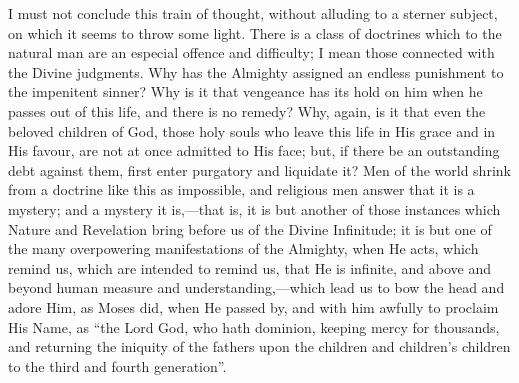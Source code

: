 I must not conclude this train of thought, without alluding to a
sterner subject, on which it seems to throw some light. There is a
class of doctrines which to the natural man are an especial offence
and difficulty; I mean those connected with the Divine judgments. Why
has the Almighty assigned an endless punishment to the impenitent
sinner? Why is it that vengeance has its hold on him when he passes
out of this life, and there is no remedy? Why, again, is it that even
the beloved children of God, those holy souls who leave this life in
His grace and in His favour, are not at once admitted to His face;
but, if there be an outstanding debt against them, first enter
purgatory and liquidate it? Men of the world shrink from a doctrine
like this as impossible, and religious men answer that it is a
mystery; and a mystery it is,—that is, it is but another of those
instances which Nature and Revelation bring before us of the Divine
Infinitude; it is but one of the many overpowering manifestations of
the Almighty, when He acts, which remind us, which are intended to
remind us, that He is infinite, and above and beyond human measure and
understanding,—which lead us to bow the head and adore Him, as Moses
did, when He passed by, and with him awfully to proclaim His Name, as
``the Lord God, who hath dominion, keeping mercy for thousands,
and returning the iniquity of the fathers upon the children and
children's children to the third and fourth generation''.


